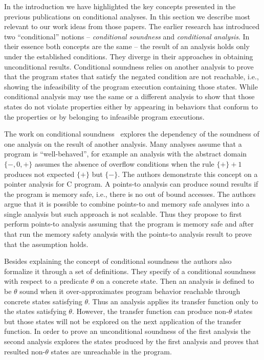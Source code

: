 In the introduction we have highlighted the key concepts presented in the previous publications on conditional analyses. In this section we describe most relevant to our work ideas from those papers. The earlier research has introduced two ``conditional'' notions -- {\em conditional soundness} and {\em conditional analysis}. In their essence both concepts are the same -- the result of an analysis holds only under the established conditions. They diverge in their approaches in obtaining unconditional results. Conditional soundness relies on another analysis to prove that the program states that satisfy the negated condition are not reachable, i.e., showing the infeasibility of the program execution containing those states. While conditional analysis may use the same or a different analysis to show that those states do not violate properties either by appearing in behaviors that conform to the properties or by belonging to  infeasible program executions.

The work on conditional soundness~\cite{Conway:SAS08} explores the dependency of the soundness of one analysis on the result of another analysis. Many analyses assume that a program is ``well-behaved'', for example an analysis with the abstract domain $\{-,0,+\}$ assumes the absence of overflow conditions when the rule $\{+\} + 1$ produces not expected $\{+\}$ but $\{-\}$. The authors demonstrate this concept on a pointer analysis for C program. A points-to analysis can produce sound results if the program is memory safe, i.e., there is no out of bound accesses. The authors argue that it is possible to combine points-to and memory safe analyses into a single analysis but such approach is not scalable. Thus they propose to first perform points-to analysis assuming that the program is memory safe and after that run the memory safety analysis with the points-to analysis result to prove that the assumption holds.

Besides explaining the concept of conditional soundness the authors also formalize it through a set of definitions. They specify of a conditional soundness with respect to a predicate $\theta$ on a concrete state. Then an analysis is defined to be $\theta$ sound when it over-approximates program behavior reachable through concrete states satisfying $\theta$. Thus an analysis applies its transfer function only to the states satisfying $\theta$. However, the transfer function can produce non-$\theta$ states but those states will not be explored on the next application of the transfer function.  In order to prove an unconditional soundness of the first analysis the second analysis explores the states produced by the first analysis and proves that resulted non-$\theta$ states are unreachable in the program.

